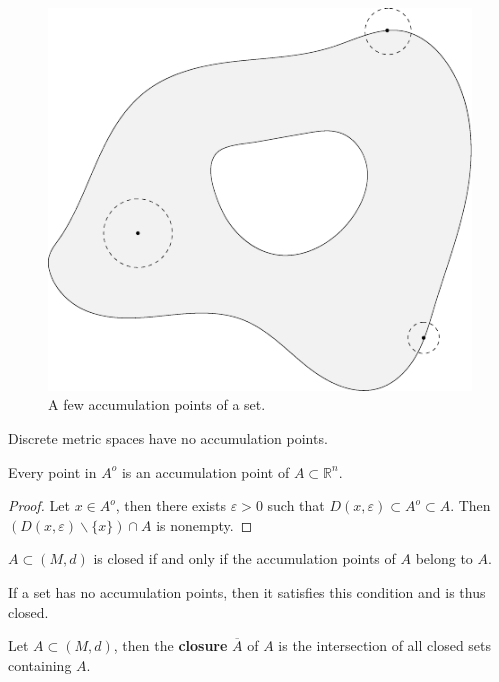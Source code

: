 \documentclass[twoside,10pt]{report}
\begin{document}
\begin{figure}[H]
	\centering
	\includegraphics[scale=0.6]{fig/accumulation-pt.pdf}
	\caption{A few accumulation points of a set.}
\end{figure}


\begin{ex}[]
Discrete metric spaces have no accumulation points.
\end{ex}

\begin{prop}
	Every point in $A^o$ is an accumulation point of $A \subset \mathbb{R}^n$.
\end{prop}
\begin{proof}
	Let $x \in A^o$, then there exists $\varepsilon>0$ such that $D(x,\varepsilon) \subset A^o \subset A$. Then $(D(x,\varepsilon) \backslash \{x\}) \cap A$ is nonempty.
\end{proof}

\begin{prop}
	$A \subset (M,d)$ is closed if and only if the accumulation points of $A$ belong to $A$.
\end{prop}

If a set has no accumulation points, then it satisfies this condition and is thus closed.

\begin{defn}[]
	Let $A \subset (M,d)$, then the \textbf{closure} $\overline{A}$ of $A$ is the intersection of all closed sets containing $A$.
\end{defn}
\end{document}
